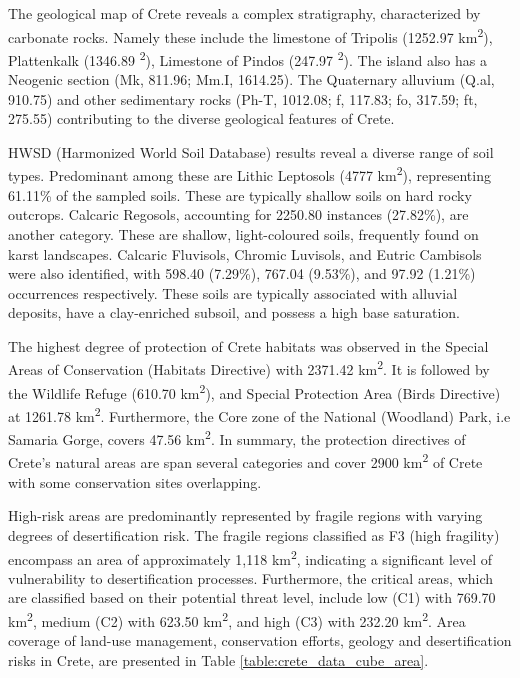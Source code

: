 The geological map of Crete reveals a complex stratigraphy, characterized by carbonate
rocks. Namely these include the limestone of Tripolis (1252.97 km\textsuperscript{2}),
Plattenkalk (1346.89 \textsuperscript{2}), Limestone of Pindos (247.97 \textsuperscript{2}).
The island also has a Neogenic section (Mk, 811.96; Mm.I, 1614.25). The
Quaternary alluvium (Q.al, 910.75) and other sedimentary rocks (Ph-T, 1012.08; f, 117.83; fo, 317.59; ft, 275.55)
contributing to the diverse geological features of Crete.

HWSD (Harmonized World Soil Database) results reveal a diverse range of soil types.
Predominant among these are Lithic Leptosols (4777 km\textsuperscript{2}),
representing 61.11\% of the sampled soils.
These are typically shallow soils on hard rocky outcrops.
Calcaric Regosols, accounting for 2250.80 instances (27.82\%),
are another category. These are shallow, light-coloured soils, frequently
found on karst landscapes.
Calcaric Fluvisols, Chromic Luvisols, and Eutric Cambisols were also
identified, with 598.40 (7.29\%), 767.04 (9.53\%), and 97.92 (1.21\%) occurrences
respectively. These soils are typically associated with alluvial deposits, have
a clay-enriched subsoil, and possess a high base saturation.

The highest degree of protection of Crete habitats was observed in the Special Areas
of Conservation (Habitats Directive) with 2371.42 km\textsuperscript{2}.
It is followed by the Wildlife Refuge (610.70 km\textsuperscript{2}),
and Special Protection Area (Birds Directive) at 1261.78 km\textsuperscript{2}.
Furthermore, the Core zone of the National (Woodland) Park, i.e Samaria Gorge, covers 47.56 km\textsuperscript{2}.
In summary, the protection directives of Crete's natural areas are span several categories and cover 2900 km\textsuperscript{2}
of Crete with some conservation sites overlapping.

High-risk areas are predominantly represented by fragile regions with varying
degrees of desertification risk. The fragile regions classified as F3 (high fragility)
encompass an area of approximately 1,118 km\textsuperscript{2},
indicating a significant level of vulnerability to desertification processes.
Furthermore, the critical areas, which are classified based on their potential
threat level, include low (C1) with 769.70 km\textsuperscript{2}, medium (C2)
with 623.50 km\textsuperscript{2}, and high (C3) with 232.20 km\textsuperscript{2}.
Area coverage of land-use management, conservation efforts, geology and
desertification risks in Crete, are presented in Table \ref{table:crete_data_cube_area}.

